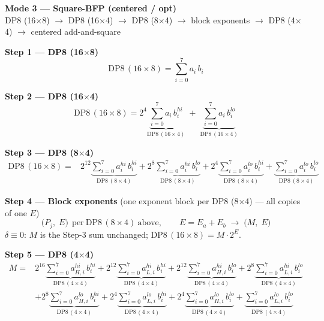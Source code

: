 \documentclass[fleqn]{article}
\newcommand{\DPop}[3]{\mathrm{DP#1}\,(#2\!\times\!#3)}
\begin{document}
\begin{center}
{\LARGE \textbf{Mode 3 --- Square-BFP (centered / opt)}}\\[4pt]
{\large DP8 (16$\times$8) $\rightarrow$ DP8 (16$\times$4) $\rightarrow$ DP8 (8$\times$4) $\rightarrow$ block exponents $\rightarrow$ DP8 (4$\times$4) $\rightarrow$ centered add-and-square}
\end{center}

\textbf{Step 1 --- DP8 (16$\times$8)}
\[ \DPop{8}{16}{8} = \sum_{i=0}^{7} a_i \, b_i \]

\textbf{Step 2 --- DP8 (16$\times$4)}
\[
\DPop{8}{16}{8}
  = 2^{4}\underbrace{\sum_{i=0}^{7} a_i \, b_i^{hi}}_{\DPop{8}{16}{4}}
  \; + \; \underbrace{\sum_{i=0}^{7} a_i \, b_i^{lo}}_{\DPop{8}{16}{4}}
\]

\textbf{Step 3 --- DP8 (8$\times$4)}
\begin{align*}
\DPop{8}{16}{8} = {}
  & 2^{12}\underbrace{\sum_{i=0}^{7} a_i^{hi} \, b_i^{hi}}_{\DPop{8}{8}{4}}
  + 2^{8}\underbrace{\sum_{i=0}^{7} a_i^{hi} \, b_i^{lo}}_{\DPop{8}{8}{4}}
  + 2^{4}\underbrace{\sum_{i=0}^{7} a_i^{lo} \, b_i^{hi}}_{\DPop{8}{8}{4}}
  + \underbrace{\sum_{i=0}^{7} a_i^{lo} \, b_i^{lo}}_{\DPop{8}{8}{4}}
\end{align*}

\textbf{Step 4 --- Block exponents}\quad
{\small(one exponent block per DP8 (8$\times$4) --- all copies of one $E$)}
\[
\big(P_j,\; E\big)\ \ \text{per}\ \DPop{8}{8}{4}\ \text{above}, \qquad E = E_a + E_b
\;\longrightarrow\;
\big(M,\; E\big)
\]
$\delta\equiv0$: $M$ is the Step-3 sum unchanged; \quad $\DPop{8}{16}{8}=M\cdot2^{E}$.

\textbf{Step 5 --- DP8 (4$\times$4)}
\begin{align*}
M = {}
  & 2^{16}\underbrace{\sum_{i=0}^{7} a_{H,i}^{hi}\, b_i^{hi}}_{\DPop{8}{4}{4}}
  + 2^{12}\underbrace{\sum_{i=0}^{7} a_{L,i}^{hi}\, b_i^{hi}}_{\DPop{8}{4}{4}}
  + 2^{12}\underbrace{\sum_{i=0}^{7} a_{H,i}^{hi}\, b_i^{lo}}_{\DPop{8}{4}{4}}
  + 2^{8}\underbrace{\sum_{i=0}^{7} a_{L,i}^{hi}\, b_i^{lo}}_{\DPop{8}{4}{4}} \\[0.3em]
  & + 2^{8}\underbrace{\sum_{i=0}^{7} a_{H,i}^{lo}\, b_i^{hi}}_{\DPop{8}{4}{4}}
  + 2^{4}\underbrace{\sum_{i=0}^{7} a_{L,i}^{lo}\, b_i^{hi}}_{\DPop{8}{4}{4}}
  + 2^{4}\underbrace{\sum_{i=0}^{7} a_{H,i}^{lo}\, b_i^{lo}}_{\DPop{8}{4}{4}}
  + \underbrace{\sum_{i=0}^{7} a_{L,i}^{lo}\, b_i^{lo}}_{\DPop{8}{4}{4}}
\end{align*}
\end{document}
